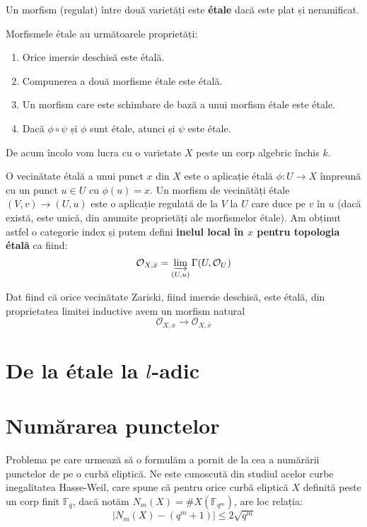 \documentclass[13pt]{book}
\begin{document}
\begin{defi}
Un morfism (regulat) între două varietăți este {\bf étale} dacă este plat și neramificat.
\end{defi}

Morfismele étale au următoarele proprietăți:

\begin{prop}
\begin{enumerate}
\item Orice imersie deschisă este étală.
\item Compunerea a două morfisme étale este étală.
\item Un morfism care este schimbare de bază a unui morfism étale este étale.
\item Dacă $\phi \circ \psi$ și $\phi$ sunt étale, atunci și $\psi$ este étale.
\end{enumerate}
\end{prop}

De acum încolo vom lucra cu o varietate $X$ peste un corp algebric închis $k$.

O vecinătate étală a unui punct $x$ din $X$ este o aplicație étală $\phi: U \rightarrow X$ împreună cu un punct $u \in U$ cu $\phi(u)=x$. Un morfism de vecinătăți étale $(V,v) \rightarrow (U,u)$ este o aplicație regulată de la $V$ la $U$ care duce pe $v$ în $u$ (dacă există, este unică, din anumite proprietăți ale morfismelor étale). Am obținut astfel o categorie index și putem defini {\bf inelul local în $x$ pentru topologia étală} ca fiind:
$$\mathcal{O}_{X, \bar{x}} = \varinjlim_{(U,u)} \Gamma(U,\mathcal{O}_U)$$

Dat fiind că orice vecinătate Zariski, fiind imersie deschisă, este étală, din proprietatea limitei inductive avem un morfism natural
$$\mathcal{O}_{X, x} \rightarrow \mathcal{O}_{X, \bar{x}}$$

\section{}

\chapter{De la étale la $l$-adic}

\chapter{Numărarea punctelor}

Problema pe care urmează să o formulăm a pornit de la cea a numărării punctelor de pe o curbă eliptică. Ne este cunoscută din studiul acelor curbe inegalitatea Hasse-Weil, care spune că pentru orice curbă eliptică $X$ definită peste un corp finit $\mathbb{F}_q$, dacă notăm $N_m(X)=\#X(\mathbb{F}_{q^m})$, are loc relația:
$$|N_m(X) - (q^m+1)| \leq 2\sqrt{q^m}$$
\end{document}
